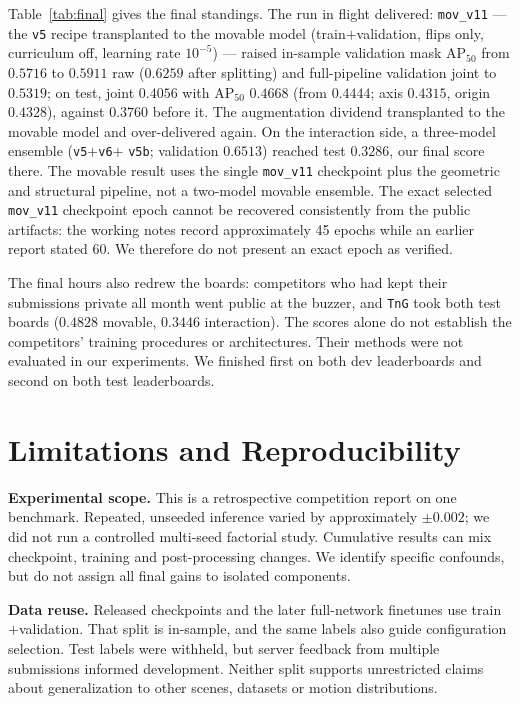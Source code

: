 \documentclass[11pt]{article}
\newcommand{\apfifty}{AP$_{50}$}
\begin{document}
Table~\ref{tab:final} gives the final standings. The run in flight
delivered: \texttt{mov\_v11} --- the \texttt{v5} recipe transplanted to the
movable model (train$+$validation, flips only, curriculum off, learning
rate $10^{-5}$) --- raised in-sample validation mask
\apfifty{} from $0.5716$ to $0.5911$ raw ($0.6259$ after splitting) and
full-pipeline validation joint to $0.5319$; on test, joint
$\mathbf{0.4056}$ with \apfifty{} $0.4668$ (from $0.4444$; axis $0.4315$,
origin $0.4328$), against $0.3760$ before it. The augmentation dividend
transplanted to the movable model and over-delivered again. On the
interaction side, a three-model ensemble (\texttt{v5}$+$\texttt{v6}$+$%
\texttt{v5b}; validation $0.6513$) reached test $\mathbf{0.3286}$, our
final score there. The movable result uses the single \texttt{mov\_v11}
checkpoint plus the geometric and structural pipeline, not a two-model
movable ensemble. The exact selected \texttt{mov\_v11} checkpoint epoch
cannot be recovered consistently from the public artifacts: the working
notes record approximately 45 epochs while an earlier report stated 60.
We therefore do not present an exact epoch as verified.

The final hours also redrew the boards: competitors who had kept their
submissions private all month went public at the buzzer, and \texttt{TnG}
took both test boards ($0.4828$ movable, $0.3446$ interaction). The scores alone do not establish the competitors' training procedures
or architectures. Their methods were not evaluated in our experiments. We finished first on both dev leaderboards and
second on both test leaderboards.

\section{Limitations and Reproducibility}

\textbf{Experimental scope.} This is a retrospective competition report on
one benchmark. Repeated, unseeded inference varied by approximately
$\pm0.002$; we did not run a controlled multi-seed factorial study. Cumulative
results can mix checkpoint, training and post-processing changes. We identify
specific confounds, but do not assign all final gains to isolated components.

\textbf{Data reuse.} Released checkpoints and the later full-network finetunes
use train$+$validation. That split is in-sample, and the same labels also guide
configuration selection. Test labels were withheld, but server feedback from
multiple submissions informed development. Neither split supports unrestricted
claims about generalization to other scenes, datasets or motion distributions.
\end{document}
